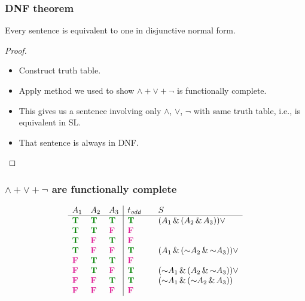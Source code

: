 \begin{frame}
\frametitle{DNF theorem}

\begin{theorem}
Every sentence is equivalent to one in disjunctive normal form.
\end{theorem}

\begin{proof}
  \begin{itemize}[<+->]
    \item Construct truth table.
    \item Apply method we used to show ${\land}
    + {\lor} + {\lnot}$ is functionally complete.
    \item This gives us a sentence
    involving only $\land$, $\lor$, $\lnot$ with same truth table, i.e.,
    is equivalent in SL.
    \item That sentence is always in DNF.
  \end{itemize}
\end{proof}
\end{frame}

\begin{frame}
  \frametitle{$\land + \lor + \lnot$ are functionally complete}
\[
\begin{array}{lll|l@{\qquad}l}
A_1 & A_2 & A_3 & t_\mathit{odd} & S \\
\hline
\True & \True & \True & \True & {(A_1 \land (A_2 \land A_3))} \lor\\
\True & \True & \False & \False \\
\True & \False & \True & \False \\
\True & \False & \False & \True & {(A_1 \land (\lnot A_2 \land \lnot A_3))} \lor\\
\False & \True & \True & \False \\
\False & \True & \False & \True & {(\lnot A_1 \land (A_2 \land \lnot A_3))} \lor\\
\False & \False & \True & \True & {(\lnot A_1 \land (\lnot A_2 \land A_3))}\\
\False & \False & \False & \False
\end{array}\]
\end{frame}

